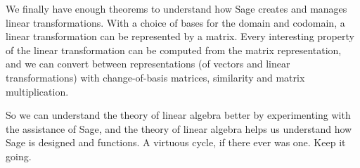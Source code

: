 We finally have enough theorems to understand how Sage creates and manages linear transformations.  With a choice of bases for the domain and codomain, a linear transformation can be represented by a matrix.  Every interesting property of the linear transformation can be computed from the matrix representation, and we can convert between representations (of vectors and linear transformations) with change-of-basis matrices, similarity and matrix multiplication.\par
%
So we can understand the theory of linear algebra better by experimenting with the assistance of Sage, and the theory of linear algebra helps us understand how Sage is designed and functions.  A virtuous cycle, if there ever was one.  Keep it going.
%
\begin{sageverbatim}
\end{sageverbatim}
%
